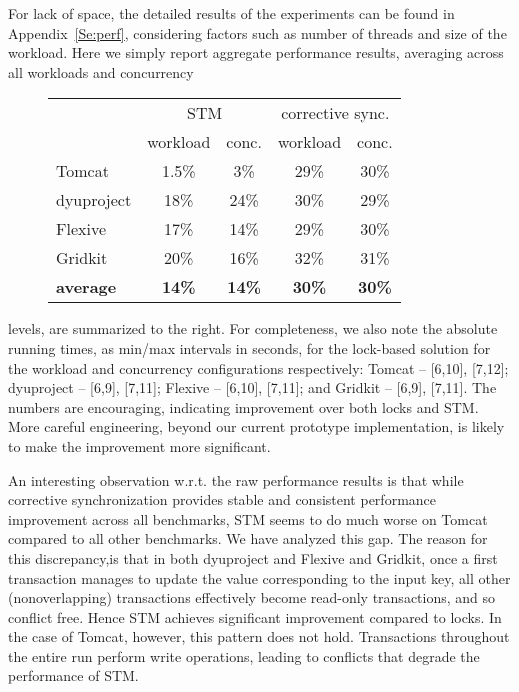 For lack of space, the detailed results of the experiments can be found in Appendix~\ref{Se:perf}, considering factors such as number of threads and size of the workload. Here we simply report aggregate performance results, averaging across all workloads and concurrency
\begin{wrapfigure}[10]{r}{0.50\textwidth}
\begin{tabular}{|l|c|c|c|c|}
\hline
  & \multicolumn{2}{c|}{STM} & \multicolumn{2}{c|}{corrective sync.} \\
					\cline{2-5} 
					& workload & conc. & workload & conc. \\
\hline
Tomcat	  	 &	1.5\%		&	3\% & 29\%		& 30\% \\			   
dyuproject	 & 	18\%		& 	24\%	    & 30\% &	29\%	\\
Flexive 		&	17\%	  &		14\%			& 29\% & 30\%	\\ 
Gridkit 		&	20\% 	&		16\%		& 32\% & 31\%	\\
\hline\hline	
{\bf average} & {\bf 14\%} 	&   {\bf 14\%}    & {\bf 30\%}   & {\bf 30\%} \\
\hline
\end{tabular}
\end{wrapfigure}
levels, are summarized to the right.
For completeness, we also note the absolute running times, as min/max intervals in seconds, for the lock-based solution for the workload and concurrency configurations respectively: Tomcat -- [6,10], [7,12]; dyuproject -- [6,9], [7,11]; Flexive -- [6,10], [7,11]; and Gridkit -- [6,9], [7,11]. 
The numbers are encouraging, indicating improvement over both locks and STM. More careful engineering, beyond our current prototype implementation, is likely to make the improvement more significant.

%
An interesting observation w.r.t. the raw performance results is that while corrective synchronization provides stable and consistent performance improvement across all benchmarks, STM seems to do much worse on Tomcat compared to all other benchmarks. We have analyzed this gap.
%
The reason for this discrepancy,is that in both dyuproject and Flexive and Gridkit, once a first transaction manages to update the value corresponding to the input key, all other (nonoverlapping) transactions effectively become read-only transactions, and so conflict free. Hence STM achieves significant improvement compared to locks. In the case of Tomcat, however, this pattern does not hold. Transactions throughout the entire run perform write operations, leading to conflicts that degrade the performance of STM.

